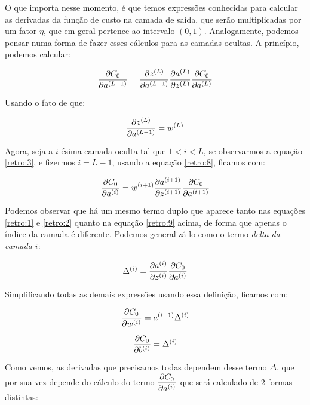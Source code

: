 O que importa nesse momento, é que temos expressões conhecidas para calcular as derivadas da função de custo na camada de saída, que serão multiplicadas por um fator $\eta$, que em geral pertence ao intervalo $(0,1)$. Analogamente, podemos pensar numa forma de fazer esses cálculos para as camadas ocultas. A princípio, podemos calcular:

\begin{equation}\label{retro:3}
\frac{\partial C_0}{\partial a^{(L-1)}} = \frac{\partial z^{(L)}}{\partial a^{(L-1)}} \frac{\partial a^{(L)}}{\partial z^{(L)}} \frac{\partial C_0}{\partial a^{(L)}}
\end{equation}

Usando o fato de que:

\begin{equation}\label{retro:8}
\frac{\partial z^{(L)}}{\partial a^{(L-1)}} = w^{(L)}
\end{equation}

Agora, seja a $i$-ésima camada oculta tal que $1 < i < L$, se observarmos a equação \ref{retro:3}, e fizermos $i = L-1$, usando a equação \ref{retro:8}, ficamos com:

\begin{equation}\label{retro:9}
\frac{\partial C_0}{\partial a^{(i)}} = w^{(i+1)} \frac{\partial a^{(i+1)}}{\partial z^{(i+1)}} \frac{\partial C_0}{\partial a^{(i+1)}}
\end{equation}

Podemos observar que há um mesmo termo duplo que aparece tanto nas equações \ref{retro:1} e \ref{retro:2} quanto na equação \ref{retro:9} acima, de forma que apenas o índice da camada é diferente. Podemos generalizá-lo como o termo \emph{delta da camada $i$}:

\begin{equation}\label{retro:12}
\Delta^{(i)} = \dfrac{\partial a^{(i)}}{\partial z^{(i)}} \dfrac{\partial C_0}{\partial a^{(i)}}
\end{equation}

Simplificando todas as demais expressões usando essa definição, ficamos com:

\begin{equation}\label{retro:13}
\frac{\partial C_0}{\partial w^{(i)}} = a^{(i-1)} \Delta^{(i)}
\end{equation}

\begin{equation}\label{retro:14}
\frac{\partial C_0}{\partial b^{(i)}} = \Delta^{(i)}
\end{equation}

Como vemos, as derivadas que precisamos todas dependem desse termo $\Delta$, que por sua vez depende do cálculo do termo $\dfrac{\partial C_0}{\partial a^{(i)}}$ que será calculado de 2 formas distintas:

